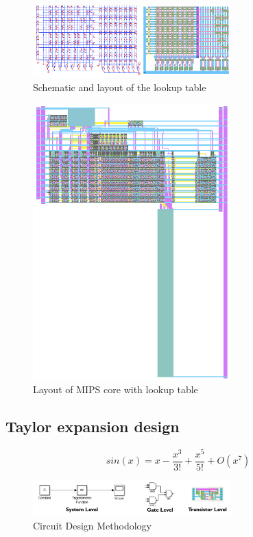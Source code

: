 \documentclass[10pt,journal]{IEEEtran}
\begin{document}
\begin{figure}[h]
\centering
\includegraphics[width=3in]{lut.png}
\caption{Schematic and layout of the lookup table}
\label{lut}
\end{figure}

\begin{figure}[h]
\centering
\includegraphics[width=3in]{mips_lut.png}
\caption{Layout of MIPS core with lookup table}
\label{mips_lut}
\end{figure}

\subsection{Taylor expansion design}
\begin{equation}
\label{sin-taylor}
sin(x) = x - \frac{x^3}{3!} + \frac{x^5}{5!}+ O(x^7)
\end{equation}

\begin{figure}[h]
\centering
\includegraphics[width=3in]{design_methodology.png}
\caption{Circuit Design Methodology}
\label{design_methodology}
\end{figure}
\end{document}
